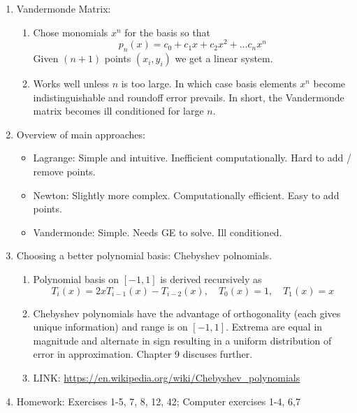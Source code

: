\documentclass{article}
\theoremstyle{remark}
\begin{document}
\begin{enumerate}
\begin{enumerate}
\end{enumerate}


\item Vandermonde Matrix:
\begin{enumerate}

\item Chose monomials $x^n$ for the basis so that
\[
p_n(x) = c_0 + c_1x + c_2 x^2 + \dots c_n x^n
\]
Given $(n+1)$ points $(x_i,y_i)$ we get a linear system. 

\item Works well unless $n$ is too large. In which case basis elements $x^n$ become indistinguishable and roundoff error prevails. In short, the Vandermonde matrix becomes ill conditioned for large $n$. 

\end{enumerate}


\item Overview of main approaches:
\begin{itemize}
\item Lagrange: Simple and intuitive. Inefficient computationally. Hard to add / remove points.
\item Newton: Slightly more complex. Computationally efficient. Easy to add points.
\item Vandermonde: Simple. Needs GE to solve. Ill conditioned.
\end{itemize}

\item Choosing a better polynomial basis: Chebyshev polnomials.
\begin{enumerate}
\item Polynomial basis on $[-1,1]$ is derived recursively as
\[
T_i(x) = 2xT_{i-1}(x)-T_{i-2}(x), \quad T_0(x)=1, \quad T_1(x)=x
\]
\item Chebyshev polynomials have the advantage of orthogonality (each gives unique information) and range is on $[-1,1]$. Extrema are equal in magnitude and alternate in sign resulting in a uniform distribution of error in approximation. Chapter 9 discuses further.
\item LINK: \url{https://en.wikipedia.org/wiki/Chebyshev_polynomials}
\end{enumerate}


\item Homework: Exercises 1-5, 7, 8, 12, 42; Computer exercises 1-4, 6,7 

\end{enumerate}
\end{document}
